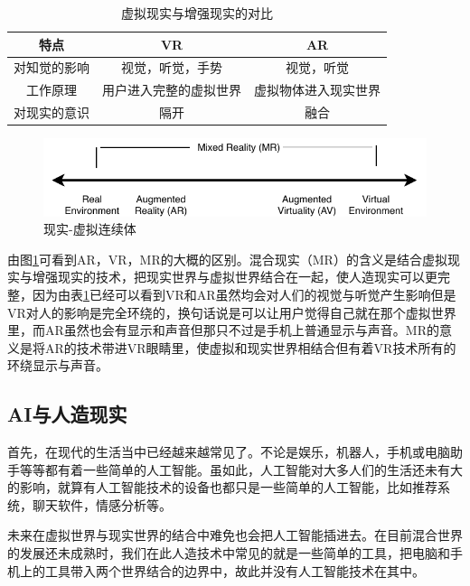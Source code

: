 \documentclass{llncs}
\begin{document}
\begin{table}
	\centering
	\caption{虚拟现实与增强现实的对比}
	\label{tb:vr-ar-difference}
	\begin{tabular}{|c|c|c|}
		\hline
		\textbf{特点}               &
		\textbf{VR}               & 
		\textbf{AR}         \\ \hline
		对知觉的影响 & 视觉，听觉，手势
		& 视觉，听觉          \\ \hline
		工作原理 & 用户进入完整的虚拟世界               & 虚拟物体进入现实世界                               \\ \hline
		对现实的意识 & 隔开               & 融合                 \\ \hline
	\end{tabular}
\end{table}

\begin{figure}
	\centering
	\includegraphics[width=0.7\linewidth]{figures/virtual_continuum}
	\caption{现实-虚拟连续体}
	\label{fig:virtualcontinuum}
\end{figure}

由图\ref{fig:virtualcontinuum}可看到AR，VR，MR的大概的区别。混合现实（MR）的含义是结合虚拟现实与增强现实的技术，把现实世界与虚拟世界结合在一起\cite{milgram1994taxonomy}，使人造现实可以更完整，因为由表\ref{tb:vr-ar-difference}已经可以看到VR和AR虽然均会对人们的视觉与听觉产生影响但是VR对人的影响是完全环绕的，换句话说是可以让用户觉得自己就在那个虚拟世界里，而AR虽然也会有显示和声音但那只不过是手机上普通显示与声音。MR的意义是将AR的技术带进VR眼睛里，使虚拟和现实世界相结合但有着VR技术所有的环绕显示与声音。

\subsection{AI与人造现实}
首先，在现代的生活当中已经越来越常见了。不论是娱乐，机器人，手机或电脑助手等等都有着一些简单的人工智能。虽如此，人工智能对大多人们的生活还未有大的影响，就算有人工智能技术的设备也都只是一些简单的人工智能，比如推荐系统，聊天软件，情感分析等。

未来在虚拟世界与现实世界的结合中难免也会把人工智能插进去。在目前混合世界的发展还未成熟时，我们在此人造技术中常见的就是一些简单的工具，把电脑和手机上的工具带入两个世界结合的边界中，故此并没有人工智能技术在其中。
\end{document}
